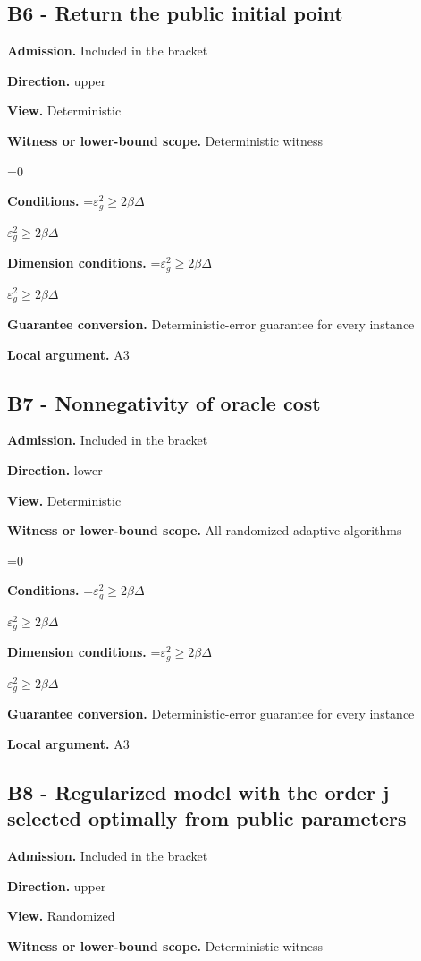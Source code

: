 \documentclass[10pt,a4paper]{article}
\newcommand{\AtlasMath}[1]{\par\begingroup\centering\setbox0=\hbox{$\displaystyle #1$}\ifdim\wd0>1.4\linewidth\typeout{ATLAS WIDE FORMULA: \the\wd0}\fi\ifdim\wd0>\linewidth\resizebox{\linewidth}{!}{\box0}\else\box0\fi\par\endgroup}
\newcommand{\AtlasInlineMath}[1]{\begingroup\setbox0=\hbox{$#1$}\ifdim\wd0>.4\linewidth\endgroup\AtlasMath{#1}\else\endgroup$#1$\fi}
\begin{document}
\subsection{B6 - Return the public initial point}
\textbf{Admission.} Included in the bracket

\textbf{Direction.} upper

\textbf{View.} Deterministic

\textbf{Witness or lower-bound scope.} Deterministic witness

\AtlasMath{0}
\textbf{Conditions.} \AtlasInlineMath{\varepsilon_g^2\ge 2\beta\Delta}

\textbf{Dimension conditions.} \AtlasInlineMath{\varepsilon_g^2\ge 2\beta\Delta}

\textbf{Guarantee conversion.} Deterministic-error guarantee for every instance

\textbf{Local argument.} A3

\subsection{B7 - Nonnegativity of oracle cost}
\textbf{Admission.} Included in the bracket

\textbf{Direction.} lower

\textbf{View.} Deterministic

\textbf{Witness or lower-bound scope.} All randomized adaptive algorithms

\AtlasMath{0}
\textbf{Conditions.} \AtlasInlineMath{\varepsilon_g^2\ge 2\beta\Delta}

\textbf{Dimension conditions.} \AtlasInlineMath{\varepsilon_g^2\ge 2\beta\Delta}

\textbf{Guarantee conversion.} Deterministic-error guarantee for every instance

\textbf{Local argument.} A3

\subsection{B8 - Regularized model with the order j selected optimally from public parameters}
\textbf{Admission.} Included in the bracket

\textbf{Direction.} upper

\textbf{View.} Randomized

\textbf{Witness or lower-bound scope.} Deterministic witness
\end{document}
